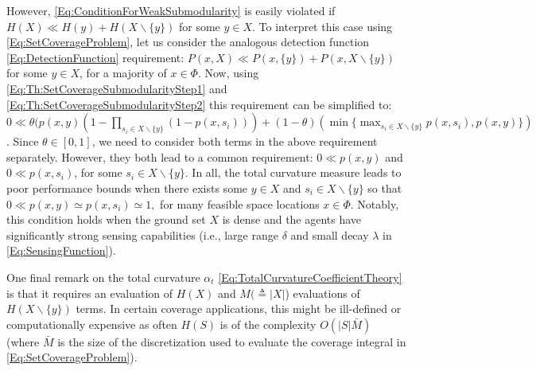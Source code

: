 \documentclass[letterpaper, 10 pt, conference]{ieeeconf}
\begin{document}
However, \eqref{Eq:ConditionForWeakSubmodularity} is easily violated if 
$H(X) \ll H(y) + H(X\backslash \{y\})$ for some $y\in X$.
To interpret this case using \eqref{Eq:SetCoverageProblem}, let us consider the analogous detection function \eqref{Eq:DetectionFunction} requirement: 
$P(x,X) \ll P(x,\{y\}) + P(x,X\backslash \{y\})$ for some $y\in X$,
for a majority of $x\in\Phi$. Now, using \eqref{Eq:Th:SetCoverageSubmodularityStep1} and \eqref{Eq:Th:SetCoverageSubmodularityStep2} this requirement can be simplified to:
$
0\ll \theta(p(x,y)(1-\prod_{s_i\in X\backslash \{y\}}(1-p(x,s_i)))
+(1-\theta)(\min\{\max_{s_i\in X\backslash \{y\}}p(x,s_i),p(x,y)\})$.  
Since $\theta \in [0,1]$, we need to consider both terms in the above requirement separately. However, they both lead to a common requirement:
$0 \ll p(x,y)$ and $0 \ll p(x,s_i)$, for some $s_i \in X\backslash \{y\}.$
In all, the total curvature measure leads to poor performance bounds when there exists some $y\in X$ and $s_i\in X\backslash \{y\}$ so that 
$0\ll p(x,y) \simeq p(x,s_i) \simeq 1,$
for many feasible space locations $x\in \Phi$. Notably, this condition holds when the ground set $X$ is dense and the agents have significantly strong sensing capabilities (i.e., large range $\delta$ and small decay $\lambda$ in \eqref{Eq:SensingFunction}).

One final remark on the total curvature $\alpha_t$ \eqref{Eq:TotalCurvatureCoefficientTheory} is that it requires an evaluation of $H(X)$ and $M(\triangleq \vert X\vert$) evaluations of $H(X\backslash \{y\})$ terms. In certain coverage applications, this might be ill-defined \cite{Sun2020} or computationally expensive as often $H(S)$ is of the complexity $O(\vert S \vert \bar{M})$ (where $\bar{M}$ is the size of the discretization used to evaluate the coverage integral in \eqref{Eq:SetCoverageProblem}).
\end{document}
